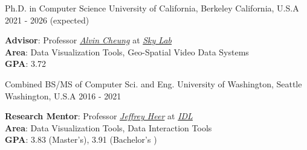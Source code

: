 
\begin{cventries}

\vspace{-4.0mm}
\begin{multicols}{2}

  \cventrycol
    {Ph.D. in Computer Science} %
    {University of California, Berkeley} %
    {California, U.S.A} %
    {2021 - 2026 (expected)} %
    {
      \vspace{-4.0mm}
      \begin{justify}
        \textbf{Advisor}: Professor \href{https://people.eecs.berkeley.edu/~akcheung/}{\textit{Alvin Cheung}} at \href{https://sky.cs.berkeley.edu/}{\textit{Sky Lab}}\\
        \textbf{Area}: Data Visualization Tools, Geo-Spatial Video Data Systems\\
        \textbf{GPA}: 3.72
      \end{justify}
    }
  \cventrycol
    {Combined BS/MS of Computer Sci. and Eng.} %
    {University of Washington, Seattle} %
    {Washington, U.S.A} %
    {2016 - 2021} %
    {
      \vspace{-4.0mm}
      \begin{justify}
        \textbf{Research Mentor}: Professor \href{https://homes.cs.washington.edu/~jheer/}{\textit{Jeffrey Heer}} at \href{https://idl.cs.washington.edu/}{\textit{IDL}}\\
        \textbf{Area}: Data Visualization Tools, Data Interaction Tools\\
        \textbf{GPA}: 3.83 (Master's), 3.91 (Bachelor's )
      \end{justify}
    }
\end{multicols}
\vspace{-8mm}
\end{cventries}
